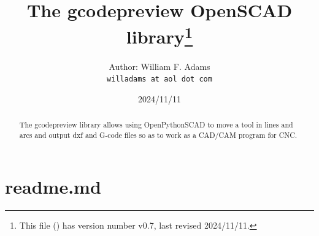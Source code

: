 \documentclass{ltxdoc}
\begin{document}

\def\fileversion{v0.7} \def\filedate{2024/11/11}







\title{The gcodepreview OpenSCAD library\thanks{This
        file (\texttt{\jobname}) has version number \fileversion, last revised
        \filedate.}}

\author{%
Author: William F. Adams\\
\texttt{willadams at aol dot com}
}
\date{\filedate}
\maketitle
\begin{abstract}
\noindent The gcodepreview library allows using OpenPythonSCAD to move a tool in lines 
and arcs and output dxf and G-code files so as to work as a CAD/\allowbreak CAM program 
for CNC.
\end{abstract}
\tableofcontents

\clearpage
\section{readme.md}
\end{document}
